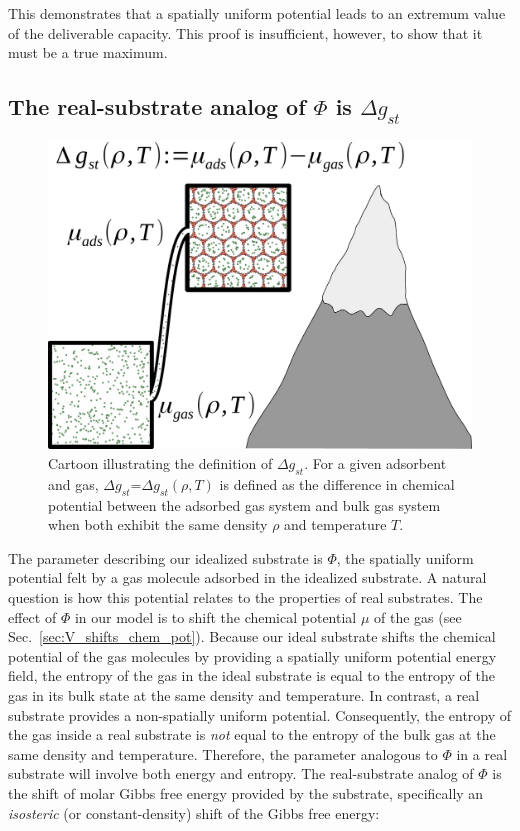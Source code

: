 \documentclass[twoside,twocolumn,9pt]{article}
\newcommand\V{\Phi}
\newcommand\gst{\ensuremath{\Delta g_{st}}}
\begin{document}
This demonstrates that a spatially uniform potential leads to an extremum value
of the deliverable capacity. This proof is insufficient, however, to show that
it must be a true maximum.

\subsection{The real-substrate analog of $\V$ is $\gst$}
\label{sec:phi-is-delta-g}
\begin{figure}
    \centering
    \includegraphics[width=\columnwidth]{g_st_simple.pdf}
    \caption{Cartoon illustrating the definition of $\gst$. For a given adsorbent and gas, $\gst$=$\gst (\rho, T)$ is defined as the difference in chemical potential between the adsorbed gas system and bulk gas system when both exhibit the same density $\rho$ and temperature $T$.}
    \label{fig:delta-G-cartoon}
\end{figure}

The parameter describing our idealized substrate is $\V$, the spatially uniform
potential felt by a gas molecule adsorbed in the idealized substrate. A natural
question is how this potential relates to the properties of real substrates.
The effect of $\V$ in our model is to shift the chemical potential $\mu$ of the
gas (see Sec.~\ref{sec:V_shifts_chem_pot}). Because our ideal substrate shifts
the chemical potential of the gas molecules by providing a spatially uniform
potential energy field, the entropy of the gas in the ideal substrate is equal
to the entropy of the gas in its bulk state at the same density and
temperature. In contrast, a real substrate provides a non-spatially uniform
potential. Consequently, the entropy of the gas inside a real substrate is
\emph{not} equal to the entropy of the bulk gas at the same density and
temperature. Therefore, the parameter analogous to $\V$ in a real substrate
will involve both energy and entropy. The real-substrate analog of $\V$ is the
shift of molar Gibbs free energy provided by the substrate, specifically an
\emph{isosteric} (or constant-density) shift of the Gibbs free energy:
\end{document}
